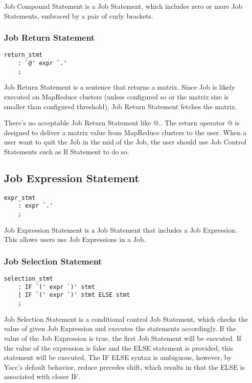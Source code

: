\documentclass[prodmode,acmtecs]{acmsmall}
\begin{document}
Job Compound Statement is a Job Statement, which includes
zero or more Job Statements, embraced by a pair of curly
brackets.

\subsubsection{Job Return Statement}

\begin{lstlisting}
return_stmt
	: `@' expr `.'
	;

\end{lstlisting}

Job Return Statement is a sentence that returns a matrix.  Since
Job is likely executed on MapReduce clusters (unless configured
so or the matrix size is smaller than configured threshold), Job
Return Statement fetches the matrix.

There's no acceptable Job Return Statement like $@.$.  The
return operator $@$ is designed to deliver a matrix value from
MapReduce clusters to the user.  When a user want to quit the Job
in the mid of the Job, the user should use Job Control Statements
such as If Statement to do so.


\subsection{Job Expression Statement}

\begin{lstlisting}
expr_stmt
	: expr `.'
	;
\end{lstlisting}

Job Expression Statement is a Job Statement that includes a Job
Expression.  This allows users use Job Expressions in a Job.

\subsubsection{Job Selection Statement}

\begin{lstlisting}
selection_stmt
	: IF `(' expr `)' stmt
	| IF `(' expr `)' stmt ELSE stmt
	;
\end{lstlisting}

Job Selection Statement is a conditional control Job Statement,
which checks the value of given Job Expression and executes the
statements accordingly.  If the value of the Job Expression is
true, the first Job Statement will be executed.  If the value of
the expression is false and the ELSE statement is provided, this
statement will be executed.  The IF ELSE syntax is ambiguous,
however, by Yacc's default behavior, reduce precedes shift, which
results in that the ELSE is associated with closer IF.
\end{document}
